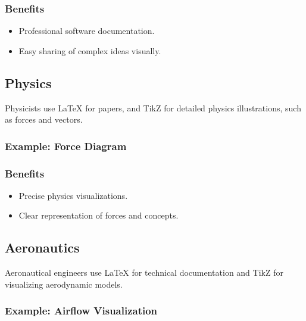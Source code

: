\documentclass{article}
\begin{document}
\subsubsection*{Benefits}
\begin{itemize}
    \item Professional software documentation.
    \item Easy sharing of complex ideas visually.
\end{itemize}

\subsection{Physics}
Physicists use LaTeX for papers, and TikZ for detailed physics illustrations, such as forces and vectors.

\subsubsection*{Example: Force Diagram}

\subsubsection*{Benefits}
\begin{itemize}
    \item Precise physics visualizations.
    \item Clear representation of forces and concepts.
\end{itemize}

\subsection{Aeronautics}
Aeronautical engineers use LaTeX for technical documentation and TikZ for visualizing aerodynamic models.

\subsubsection*{Example: Airflow Visualization}
\end{document}
